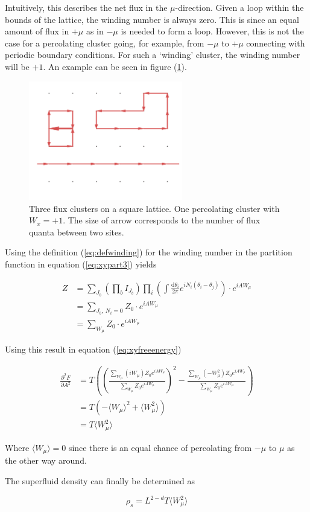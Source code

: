 Intuitively, this describes the net flux in the $\mu$-direction. Given a loop within the bounds of the lattice, the winding number is always zero. This is since an equal amount of flux in $+\mu$ as in $-\mu$ is needed to form a loop. However, this is not the case for a percolating cluster going, for example, from $-\mu$ to $+\mu$ connecting with periodic boundary conditions. For such a `winding' cluster, the winding number will be $+1$. An example can be seen in figure (\ref{fig:fluxpercolation}).

\begin{figure}[h!]
    \centering
        \includegraphics[width=0.6\textwidth]{figures/percolatingFlux.png}
    \caption{Three flux clusters on a square lattice. One percolating cluster with $W_x = +1$. The size of arrow corresponds to the number of flux quanta between two sites.}
    \label{fig:fluxpercolation}
\end{figure}

Using the definition (\ref{eq:defwinding}) for the winding number in the partition function in equation (\ref{eq:xypart3}) yields

\begin{align}
    Z &= \sum_{J_b} \left ( \prod_b I_{J_b} \right ) \prod_i \left ( \int \frac{\mathrm d \theta_i}{2 \pi} e^{i N_i (\theta_i - \theta_j)} \right ) \cdot e^{i A W_\mu} \\
    &= \sum_{J_b, \ N_i = 0} Z_0 \cdot e^{i A W_\mu} \\
    &= \sum_{W_\mu} Z_0 \cdot e^{i A W_\mu}
\end{align}

Using this result in equation (\ref{eq:xyfreeenergy})

\begin{align}
    \frac{\partial^2 F}{\partial A^2} &= T \left ( \left ( \frac{\sum_{W_\mu} (i W_\mu) Z_0 e^{iAW_\mu}}{\sum_{W_\mu} Z_0 e^{iAW_\mu}} \right )^2 - \frac{\sum_{W_\mu} (- W_\mu^2) Z_0 e^{iAW_\mu}}{\sum_{W_\mu} Z_0 e^{iAW_\mu}} \right ) \\
%
    &= T \left ( -\langle W_\mu \rangle^2 + \langle W_\mu^2 \rangle \right ) \\
%
    &= T \langle W_\mu^2 \rangle
\end{align}

Where $\langle W_\mu \rangle = 0$ since there is an equal chance of percolating from $-\mu$ to $\mu$ as the other way around.

The superfluid density can finally be determined as

\begin{equation}
    \rho_s = L^{2 - d} T \langle W_\mu^2 \rangle 
\end{equation}

